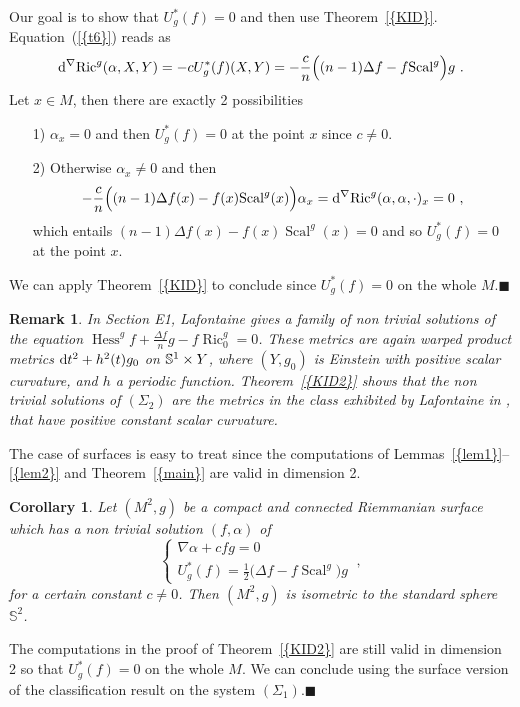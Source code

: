 \documentclass[a4paper,11pt,leqno]{amsart}
\numberwithin{equation}{section}
\theoremstyle{main}
\newtheorem{coro} [thm] {\bf  Corollary}
\newtheorem{Rq}[thm]{\bf  Remark }
\begin{document}
\proof Our goal is to show that  $U_g^* (f)=0$ and then use Theorem~{\ref{{KID}}}. Equation~({\ref{{t6}}}) reads as 
$${{\rm d}} ^\nabla {\operatorname{Ric}}^g (\alpha,X,Y)=-c U_g^*(f)(X,Y)=-\frac{c}{n}\Big((n-1) \Delta f -f {\operatorname{Scal}}^g\Big) g \ . $$
Let $x\in M$, then there are exactly 2 possibilities
\begin{enumerate}
	\item[1)] $\alpha_x=0$ and then $U^*_g (f)=0$ at the point $x$ since $c\neq 0$.
	\item[2)] Otherwise $\alpha_x\neq0$ and  then 
	$$-\frac{c}{n}\Big((n-1) \Delta f(x) -f(x) {\operatorname{Scal}}^g(x)\Big) \alpha_x = {{\rm d}} ^\nabla {\operatorname{Ric}}^g (\alpha,\alpha,\cdot)_x=0 \ , $$
which entails $(n-1) \Delta f(x) -f(x) {\operatorname{Scal}}^g(x)=0$ and so $U^*_g (f)=0$ at the point $x$.
\end{enumerate}
We can apply Theorem~{\ref{{KID}}} to conclude since $U^*_g (f)=0$ on the whole $M$.{\hfill $\blacksquare$ \medskip \\}

\begin{Rq}
In \cite{L} Section E1, Lafontaine gives a family of non trivial solutions of the equation ${\operatorname{Hess}}^g f + \frac{\Delta f}{n}g - f{\operatorname{Ric}}^g_0=0 $. These metrics are again warped product metrics  ${{\rm d}} t^2 + h^2(t) g_0$ on $\Bbb S^1 \times Y$, where $(Y,g_0)$ is Einstein with positive scalar curvature, and $h$ a periodic function. Theorem~{\ref{{KID2}}} shows that the non trivial solutions of $(\Sigma_2)$ are the metrics in the class exhibited by Lafontaine in \cite{L}, that have positive constant scalar curvature. 
\end{Rq}

The case of surfaces is easy to treat since the computations of Lemmas~{\ref{{lem1}}}--{\ref{{lem2}}} and Theorem~{\ref{{main}}} are valid in dimension 2.

\begin{coro}
	Let  $(M^2, g)$ be a compact and connected Riemmanian surface which has a non trivial solution $(f,\alpha)$ of
$$ \left\{
\begin{array}{l}
	 \nabla\alpha + cfg= 0 \\
	 U_g^* (f)=\frac{1}{2}\Big( \Delta f -f {\operatorname{Scal}}^g\Big) g
\end{array}\right. \ ,$$
for a certain constant $c \neq 0$. Then  $(M^2,g)$ is isometric to the standard sphere $\mathbb S^2$.
\end{coro}
\proof The computations in the proof of Theorem~{\ref{{KID2}}} are still valid in dimension 2 so that $U^*_g (f)=0$ on the whole $M$. We can conclude using the surface version of the classification result on the system $(\Sigma_1)$.{\hfill $\blacksquare$ \medskip \\}
\end{document}

